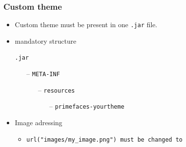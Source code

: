 \documentclass[10pt,xcolor=pdflatex]{beamer}
\begin{document}
\begin{frame}[containsverbatim]\frametitle{Custom theme}
  \begin{itemize}
    \item Custom theme must be present in one \texttt{.jar} file.
	\item mandatory structure
    \item[] \texttt{.jar}
      \begin{itemize}
        \item[--] {\normalsize \texttt{META-INF}}
          \begin{itemize}
            \item[--] {\normalsize \texttt{resources}}
            \item[] {~ ~ -- \normalsize \texttt{primefaces-yourtheme}}
          \end{itemize}
      \end{itemize}
    \item Image adressing
      \begin{itemize}
        \item {\verb;url("images/my_image.png") must be changed to;}
      \end{itemize}
  \end{itemize}
\end{frame}
\end{document}
